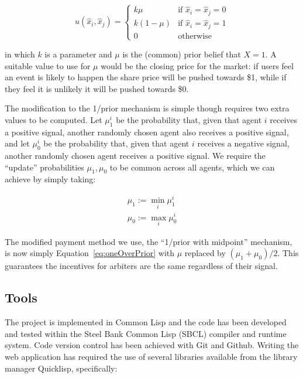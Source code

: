 \begin{equation}
	\label{eq:oneOverPrior}
	u(\hat{x}_i, \hat{x}_j) =
	\begin{cases}
		k \mu & \text{if } \hat{x}_i = \hat{x}_j = 0 \\
		k (1-\mu) & \text{if } \hat{x}_i = \hat{x}_j = 1 \\
		0 & \text{otherwise}
	\end{cases}
\end{equation}

in which $k$ is a parameter and $\mu$ is the (common) prior belief that $X=1$.
A suitable value to use for $\mu$ would be the closing price for the market: if
users feel an event is likely to happen the share price will be pushed towards
\$1, while if they feel it is unlikely it will be pushed towards \$0.

The modification to the 1/prior mechanism is simple though requires two extra
values to be computed. Let $\mu_1^i$ be the probability that, given that agent
$i$ receives a positive signal, another randomly chosen agent also receives a
positive signal, and let $\mu_0^i$ be the probability that, given that agent
$i$ receives a negative signal, another randomly chosen agent receives a
positive signal. We require the ``update'' probabilities $\mu_1, \mu_0$ to be
common across all agents, which we can achieve by simply taking:

\begin{equation}
	\begin{gathered}
		\mu_1 := \min_i \mu_1^i \\
		\mu_0 := \max_i \mu_0^i
	\end{gathered}
\end{equation}

The modified payment method we use, the ``1/prior with midpoint'' mechanism, is
now simply Equation~\ref{eq:oneOverPrior} with $\mu$ replaced by $(\mu_1 +
\mu_0)/2$. This guarantees the incentives for arbiters are the same regardless
of their signal.




\subsection{Tools}

The project is implemented in Common Lisp and the code has been developed and
tested within the Steel Bank Common Lisp (SBCL) compiler and runtime system.
Code version control has been achieved with Git and Github.  Writing the web
application has required the use of several libraries available from the
library manager Quicklisp, specifically:

